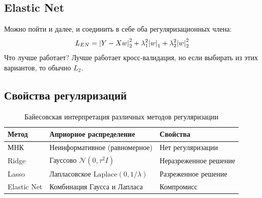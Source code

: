 \subsection{Elastic Net}

Можно пойти и далее, и соединить в себе оба регуляризационных члена:
\[ L_{EN} = \abs{Y - Xw}_2^2 + \lambda_1^2 \abs{w}_1 + \lambda_2^2 \abs{w}_2^2 \]
Что лучше работает?
Лучше работает кросс-валидация, но если выбирать из этих вариантов, то обычно $L_2$.

\subsection{Свойства регуляризаций}

\begin{table}[h]
    \centering
    \begin{tabular}{|l|l|l|}
        \hline
        \textbf{Метод} & \textbf{Априорное распределение}            & \textbf{Свойства}     \\ \hline
        МНК            & Неинформативное (равномерное)               & Нет регуляризации     \\ \hline
        Ridge          & Гауссово $\mathcal{N}(0, \tau^2 I)$      & Неразреженное решение \\ \hline
        Lasso          & Лапласовское $\text{Laplace}(0, 1/\lambda)$ & Разреженное решение   \\ \hline
        Elastic Net    & Комбинация Гаусса и Лапласа                 & Компромисс            \\ \hline
    \end{tabular}
    \caption{Байесовская интерпретация различных методов регуляризации}
    \label{tab:regul}
\end{table}